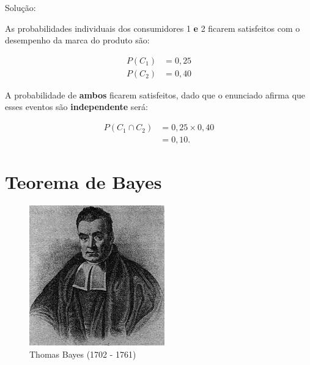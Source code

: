 \documentclass[
]{book}
\begin{document}
\hfill\break

Solução:

As probabilidades individuais dos consumidores 1 \textbf{e} 2 ficarem satisfeitos com o desempenho da marca do produto são:

\begin{align*}
P(C_{1}) & = 0,25\\
P(C_{2}) & = 0,40
\end{align*}

\hfill\break

A probabilidade de \textbf{ambos} ficarem satisfeitos, dado que o enunciado afirma que esses eventos são \textbf{independente} será:

\begin{align*}
P(C_{1} \cap C_{2}) & = 0,25 \times 0,40\\
                    & = 0,10.
\end{align*}

\hfill\break

\hypertarget{teorema-de-bayes}{%
\section{Teorema de Bayes}\label{teorema-de-bayes}}

\hfill\break

\begin{figure}

{\centering \includegraphics[width=0.8\linewidth]{images4/thomas_bayes} 

}

\caption{Thomas Bayes (1702 - 1761)}\label{fig:unnamed-chunk-71}
\end{figure}
\end{document}
